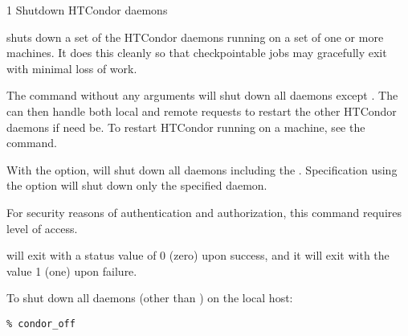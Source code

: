 \begin{ManPage}{\label{man-condor-off}}{1}
{Shutdown HTCondor daemons}

\Synopsis {}
\ToolArgsBase

\ToolDebugOption
\ToolWhere
\ToolArgsAffect

\Description 

 shuts down a set of the HTCondor daemons running on a set of
one or more machines.
It does this cleanly so that checkpointable jobs may gracefully exit with
minimal loss of work.

The command  without any arguments will shut down
all daemons except .
The  can then handle both local and remote
requests to restart the other HTCondor daemons if need be.  To restart
HTCondor running on a machine, see the  command.

With the  option,  will shut down
all daemons including the .
Specification using the  option
will shut down
only the specified daemon.

For security reasons of authentication and authorization,
this command requires  level of access.

\begin{Options}
	\ToolArgsBaseDesc
	\ToolDebugDesc
	\ToolArgsLocateDesc
	\ToolArgsAffectDesc
\end{Options}

\ExitStatus
{} will exit with a status value of 0 (zero) upon success,
and it will exit with the value 1 (one) upon failure.


\Examples
To shut down all daemons (other than ) on the
local host:
\begin{verbatim}
% condor_off
\end{verbatim}


\end{ManPage}

